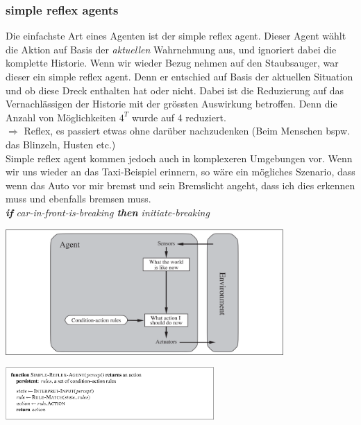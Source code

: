 \documentclass{article}
\newenvironment{Figure}
	{\par\medskip\noindent\minipage{\linewidth}}
	{\endminipage\par\medskip}
\theoremstyle{merke}
\theoremstyle{definition}
\begin{document}
\subsubsection{simple reflex agents}
Die einfachste Art eines Agenten ist der simple reflex agent. Dieser Agent wählt die Aktion auf Basis der \textit{aktuellen} Wahrnehmung aus, und ignoriert dabei die komplette Historie. Wenn wir wieder Bezug nehmen auf den Staubsauger, war dieser ein simple reflex agent. Denn er entschied auf Basis der aktuellen Situation und ob diese Dreck enthalten hat oder nicht. Dabei ist die Reduzierung auf das Vernachlässigen der Historie mit der grössten Auswirkung betroffen. Denn die Anzahl von Möglichkeiten $4^T$ wurde auf 4 reduziert. \\
$\Rightarrow$ Reflex, es passiert etwas ohne darüber nachzudenken (Beim Menschen bspw. das Blinzeln, Husten etc.)\\
Simple reflex agent kommen jedoch auch in komplexeren Umgebungen vor. Wenn wir uns wieder an das Taxi-Beispiel erinnern, so wäre ein mögliches Szenario, dass wenn das Auto vor mir bremst und sein Bremslicht angeht, dass ich dies erkennen muss und ebenfalls bremsen muss.\\
\textit{\textbf{if} car-in-front-is-breaking \textbf{then}   initiate-breaking}\\
\begin{Figure}
\centering
\includegraphics[width=400px]{img/SchemaSimpleReflexAgent.png}
	\label{fig:Schema eines Simple Reflex Agent}
\end{Figure}
\begin{Figure}
\centering
\includegraphics[width=300px]{img/FunctionSimpleReflexAgent.png}
	\label{fig:Function eines Simple Reflex Agent}
\end{Figure}
\end{document}

